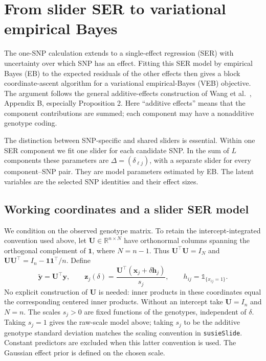 \documentclass[11pt]{article}
\newcommand{\ind}{\mathbb{1}}
\begin{document}
\section{From slider SER to variational empirical Bayes}
\label{sec:slider-veb}

The one-SNP calculation extends to a single-effect regression (SER)
with uncertainty over which SNP has an effect. Fitting this SER model
by empirical Bayes (EB) to the expected residuals of the other effects
then gives a block coordinate-ascent algorithm for a variational
empirical-Bayes (VEB) objective. The argument follows the general
additive-effects construction of Wang et al.~\cite{wang2018susie},
Appendix B, especially Proposition 2. Here ``additive effects'' means
that the component contributions are summed; each component may have
a nonadditive genotype coding.

The distinction between SNP-specific and shared sliders is essential.
Within one SER component we fit one slider for each candidate SNP.
In the sum of $L$ components these parameters are
$\Delta=(\delta_{\ell j})$, with a separate slider for every
component--SNP pair. They are model parameters estimated by EB.
The latent variables are the selected SNP identities and their effect
sizes.

\subsection{Working coordinates and a slider SER model}

We condition on the observed genotype matrix. To retain the
intercept-integrated convention used above, let
$\mathbf U\in\mathbb R^{n\times N}$ have orthonormal columns spanning
the orthogonal complement of $\mathbf 1$, where $N=n-1$. Thus
$\mathbf U^\top\mathbf U=I_N$ and
$\mathbf U\mathbf U^\top=I_n-\mathbf 1\mathbf 1^\top/n$.
Define
\begin{equation}
\widetilde{\mathbf y}=\mathbf U^\top\mathbf y,\qquad
\mathbf z_j(\delta)
 =\frac{\mathbf U^\top(\mathbf x_j+\delta\mathbf h_j)}{s_j},
\qquad h_{ij}=\ind_{\{x_{ij}=1\}}.
\label{eq:veb-working-design}
\end{equation}
No explicit construction of $\mathbf U$ is needed: inner products in
these coordinates equal the corresponding centered inner products.
Without an intercept take $\mathbf U=I_n$ and $N=n$.
The scales $s_j>0$ are fixed functions of the genotypes, independent
of $\delta$. Taking $s_j=1$ gives the raw-scale model above; taking
$s_j$ to be the additive genotype standard deviation matches the
scaling convention in \texttt{susieSlide}. Constant predictors are
excluded when this latter convention is used. The Gaussian effect
prior is defined on the chosen scale.
\end{document}
